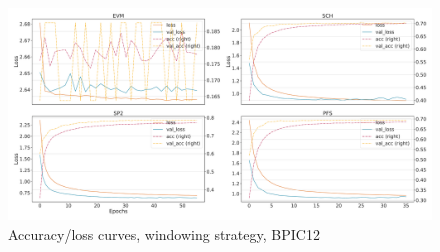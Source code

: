 \begin{figure}[!htb]
    \centering
    \includegraphics[width=\textwidth]{gfx/bpic2012/windowed_loss_acc_curve.pdf}
    \caption{Accuracy/loss curves, windowing strategy, BPIC12}
\end{figure}
\FloatBarrier

